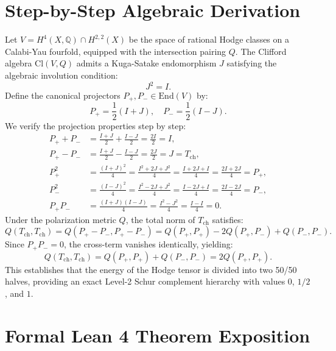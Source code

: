 \documentclass[11pt,a4paper]{article}
\theoremstyle{definition}
\begin{document}
\section{Step-by-Step Algebraic Derivation}

Let $V = H^4(X, \mathbb{Q}) \cap H^{2,2}(X)$ be the space of rational Hodge classes on a Calabi-Yau fourfold, equipped with the intersection pairing $Q$. The Clifford algebra $\mathrm{Cl}(V, Q)$ admits a Kuga-Satake endomorphism $J$ satisfying the algebraic involution condition:
\begin{equation}
J^2 = I.
\end{equation}
Define the canonical projectors $P_+, P_- \in \mathrm{End}(V)$ by:
\begin{equation}
P_+ = \frac{1}{2}(I + J), \quad P_- = \frac{1}{2}(I - J).
\end{equation}
We verify the projection properties step by step:
\begin{align}
P_+ + P_- &= \frac{I + J}{2} + \frac{I - J}{2} = \frac{2I}{2} = I, \\
P_+ - P_- &= \frac{I + J}{2} - \frac{I - J}{2} = \frac{2J}{2} = J = T_{\mathrm{ch}}, \\
P_+^2 &= \frac{(I + J)^2}{4} = \frac{I^2 + 2J + J^2}{4} = \frac{I + 2J + I}{4} = \frac{2I + 2J}{4} = P_+, \\
P_-^2 &= \frac{(I - J)^2}{4} = \frac{I^2 - 2J + J^2}{4} = \frac{I - 2J + I}{4} = \frac{2I - 2J}{4} = P_-, \\
P_+ P_- &= \frac{(I + J)(I - J)}{4} = \frac{I^2 - J^2}{4} = \frac{I - I}{4} = 0.
\end{align}
Under the polarization metric $Q$, the total norm of $T_{\mathrm{ch}}$ satisfies:
\begin{equation}
Q(T_{\mathrm{ch}}, T_{\mathrm{ch}}) = Q(P_+ - P_-, P_+ - P_-) = Q(P_+, P_+) - 2Q(P_+, P_-) + Q(P_-, P_-).
\end{equation}
Since $P_+ P_- = 0$, the cross-term vanishes identically, yielding:
\begin{equation}
Q(T_{\mathrm{ch}}, T_{\mathrm{ch}}) = Q(P_+, P_+) + Q(P_-, P_-) = 2 Q(P_+, P_+).
\end{equation}
This establishes that the energy of the Hodge tensor is divided into two 50/50 halves, providing an exact Level-2 Schur complement hierarchy with values $0$, $1/2$, and $1$.


\section{Formal Lean 4 Theorem Exposition}
\end{document}
